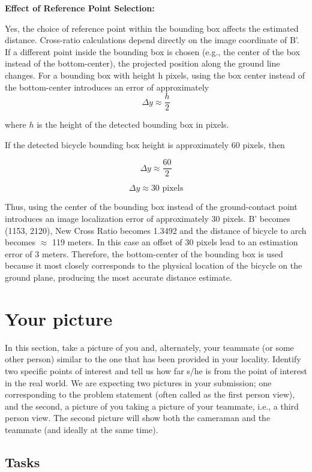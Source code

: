 \begin{studentSpace}
\textbf{Effect of Reference Point Selection:}

Yes, the choice of reference point within the bounding box affects the estimated distance. Cross-ratio calculations depend directly on the image coordinate of B'. If a different point inside the bounding box is chosen (e.g., the center of the box instead of the bottom-center), the projected position along the ground line changes. For a bounding box with height h pixels, using the box center instead of the bottom-center introduces an error of approximately
\[
\Delta y \approx \frac{h}{2}
\]

where \(h\) is the height of the detected bounding box in pixels.

If the detected bicycle bounding box height is approximately \(60\) pixels, then

\[
\Delta y \approx \frac{60}{2}
\]

\[
\Delta y \approx 30 \text{ pixels}
\]

Thus, using the center of the bounding box instead of the ground-contact point introduces an image localization error of approximately \(30\) pixels. B' becomes (1153, 2120), New Cross Ratio becomes 1.3492 and the distance of bicycle to arch becomes $\approx$ 119 meters. In this case an offset of 30 pixels lead to an estimation error of 3 meters. Therefore, the bottom-center of the bounding box is used because it most closely corresponds to the physical location of the bicycle on the ground plane, producing the most accurate distance estimate.


\end{studentSpace}


\section{Your picture}

In this section, take a picture of you and, alternately, your teammate
(or some other person) similar to the one that has been provided in
your locality. Identify two specific points of interest and tell us
how far s/he is from the point of interest in the real world. We are
expecting two pictures in your submission; one corresponding to the
problem statement (often called as the first person view), and the
second, a picture of you taking a picture of your teammate, i.e., a
third person view. The second picture will show both the cameraman and
the teammate (and ideally at the same time).

\subsection{Tasks}

